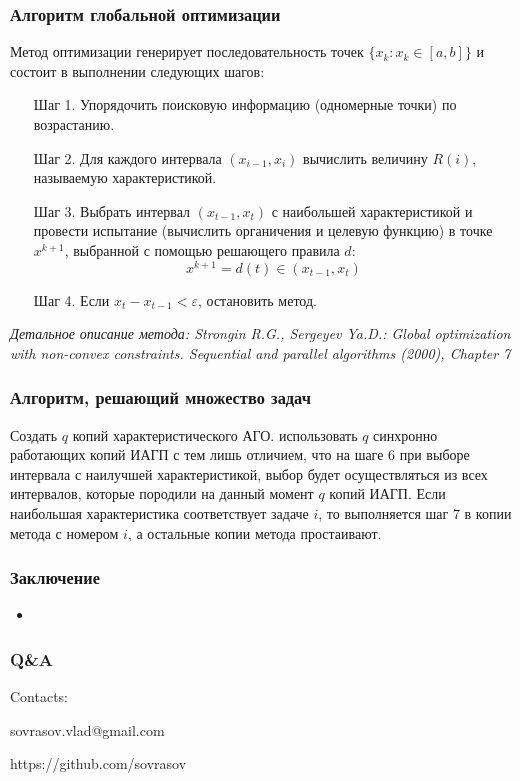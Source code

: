 \documentclass[aspectratio=1610]{beamer}
\newcommand\unnumbered{\setbeamertemplate{footline}{}}
\begin{document}
\begin{frame}
  \frametitle{Алгоритм глобальной оптимизации}
  Метод оптимизации генерирует последовательность точек \(\{x_k:x_k\in[a,b]\}\) и состоит в выполнении следующих шагов:
  \begin{enumerate}
    \setlength{\itemindent}{.1in}
    \item[Шаг 1.] Упорядочить поисковую информацию (одномерные точки) по возрастанию.
    \item[Шаг 2.] Для каждого интервала \((x_{i-1}, x_i)\) вычислить величину \(R(i)\), называемую характеристикой.
    \item[Шаг 3.] Выбрать интервал \((x_{t-1}, x_{t})\) с наибольшей характеристикой и
    провести испытание (вычислить органичения и целевую функцию) в точке \(x^{k+1}\), выбранной с помощью решающего правила \(d\):
    \begin{displaymath}
      x^{k+1}=d(t)\in (x_{t-1}, x_{t})
    \end{displaymath}
    \item[Шаг 4.] Если \(x_{t}-x_{t-1}<\varepsilon\), остановить метод.
  \end{enumerate}
  \textit{\footnotesize	{Детальное описание метода: Strongin R.G., Sergeyev Ya.D.: Global optimization with non-convex constraints. Sequential and parallel algorithms (2000), Chapter 7}}
\end{frame}

\begin{frame}
  \frametitle{Алгоритм, решающий множество задач}
  Создать \(q\) копий характеристического АГО.
  использовать \(q\) синхронно работающих копий ИАГП с тем лишь отличием, что на шаге 6 при выборе
  интервала с наилучшей характеристикой, выбор будет осуществляться из всех интервалов, которые
  породили на данный момент \(q\) копий ИАГП. Если наибольшая характеристика соответствует
  задаче \(i\), то выполняется шаг 7 в копии метода с номером \(i\), а остальные копии метода простаивают.

\end{frame}


\begin{frame}
  \frametitle{Заключение}
    \begin{itemize}
      \item
    \end{itemize}
\end{frame}
{
\unnumbered
\begin{frame}{{}}
  \frametitle{Q\&A}
  \begin{center}
    \Large{Contacts:}
\vspace{0.5cm}

    sovrasov.vlad@gmail.com

    https://github.com/sovrasov
  \end{center}
\end{frame}
}
\end{document}
